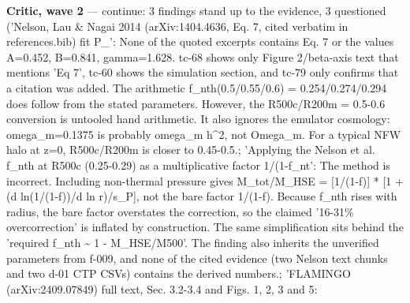 \documentclass[11pt,a4paper]{article}
\begin{document}
\textbf{Critic, wave 2} --- continue: 3 findings stand up to the evidence, 3 questioned ('Nelson, Lau \& Nagai 2014 (arXiv:1404.4636, Eq. 7, cited verbatim in references.bib) fit P\_': None of the quoted excerpts contains Eq. 7 or the values A=0.452, B=0.841, gamma=1.628. tc-68 shows only Figure 2/beta-axis text that mentions 'Eq 7', tc-60 shows the simulation section, and tc-79 only confirms that a citation was added. The arithmetic f\_nth(0.5/0.55/0.6) = 0.254/0.274/0.294 does follow from the stated parameters. However, the R500c/R200m = 0.5-0.6 conversion is untooled hand arithmetic. It also ignores the emulator cosmology: omega\_m=0.1375 is probably omega\_m h\textasciicircum{}2, not Omega\_m. For a typical NFW halo at z=0, R500c/R200m is closer to 0.45-0.5.; 'Applying the Nelson et al. f\_nth at R500c (0.25-0.29) as a multiplicative factor 1/(1-f\_nt': The method is incorrect. Including non-thermal pressure gives M\_tot/M\_HSE = [1/(1-f)] * [1 + (d ln(1/(1-f))/d ln r)/s\_P], not the bare factor 1/(1-f). Because f\_nth rises with radius, the bare factor overstates the correction, so the claimed '16-31\% overcorrection' is inflated by construction. The same simplification sits behind the 'required f\_nth \textasciitilde{} 1 - M\_HSE/M500'. The finding also inherits the unverified parameters from f-009, and none of the cited evidence (two Nelson text chunks and two d-01 CTP CSVs) contains the derived numbers.; 'FLAMINGO (arXiv:2409.07849) full text, Sec. 3.2-3.4 and Figs. 1, 2, 3 and 5:
\end{document}
